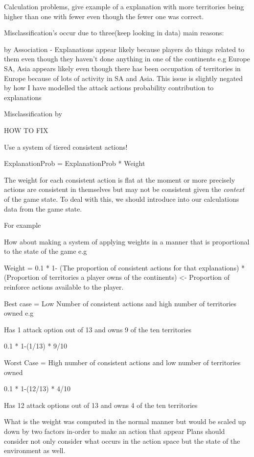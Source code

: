 \documentclass[parskip]{cs4rep}
\begin{document}
Calculation problems, give example of a explanation with more territories being higher than one with fewer even though the fewer one was correct.

Misclassification's occur due to three(keep looking in data) main reasons:

by Association - Explanations appear likely because players do things related to them even though they haven't done anything in one of the continents e.g Europe SA, Asia appears likely even though there has been occupation of territories in Europe because of lots of activity in SA and Asia. This issue is slightly negated by how I have modelled the attack actions probability contribution to explanations

Misclassification by 

HOW TO FIX

Use a system of tiered consistent actions!

ExplanationProb = ExplanationProb * Weight

The weight for each consistent action is flat at the moment or more precisely actions are consistent in themselves but may not be consistent given the \textit{context} of the game state. To deal with this, we should introduce into our calculations data from the game state.

For example

How about making a system of applying weights in a manner that is proportional to the state of the game e.g

Weight = 0.1 * 1- (The proportion of consistent actions for that explanations) * (Proportion of territories a player owns of the continents) <- Proportion of reinforce actions available to the player.

Best case = Low Number of consistent actions and high number of territories owned e.g

Has 1 attack option out of 13 and owns 9 of the ten territories

0.1 * 1-(1/13) * 9/10 

Worst Case = High number of consistent actions and low number of territories owned

0.1 * 1-(12/13) * 4/10 

Has 12 attack options out of 13 and owns 4 of the ten territories

What is the weight was computed in the normal manner but would be scaled up down by two factors in-order to make an action that appear
Plans should consider not only consider what occurs in the action space but the state of the environment as well.
\end{document}
